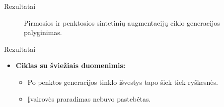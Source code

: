 \documentclass{beamer}
\begin{document}
\begin{frame}{Rezultatai}
    \begin{figure}[!htbp]
        \hfill
        \caption{Pirmosios ir penktosios sintetinių augmentacijų ciklo generacijos palyginimas.}
        \label{fig:comparison_generations}
    \end{figure}
\end{frame}

\begin{frame}{Rezultatai}
    \begin{itemize}
        \item \textbf{Ciklas su šviežiais duomenimis:}
        \begin{itemize}
            \item Po penktos generacijos tinklo išvestys tapo šiek tiek ryškesnės.
            \item Įvairovės praradimas nebuvo pastebėtas.
        \end{itemize}
    \end{itemize}
\end{frame}
\end{document}
